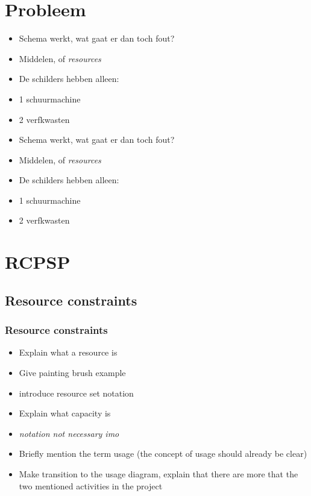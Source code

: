 \documentclass{beamer}
\theoremstyle{definition}
\newcommand{\mick}[1]{{\color{red}\emph{#1}}}
\begin{document}
\section{Probleem}
\begin{frame}
	\begin{itemize}
		\item Schema werkt, wat gaat er dan toch fout?
		\item Middelen, of \emph{resources}
		\item De schilders hebben alleen:
		\item 1 schuurmachine
		\item 2 verfkwasten
	\end{itemize}
\end{frame}

\begin{frame}
	\begin{itemize}
		\item Schema werkt, wat gaat er dan toch fout?
		\item Middelen, of \emph{resources}
		\item De schilders hebben alleen:
		\item 1 schuurmachine
		\item 2 verfkwasten
	\end{itemize}
\end{frame}

\section{RCPSP}

\subsection{Resource constraints}
\begin{frame}
	\frametitle{Resource constraints}
	\begin{itemize}
		\item Explain what a resource is
		\item Give painting brush example
		\item introduce resource set notation
		\item Explain what capacity is
		\item \mick{notation not necessary imo}
		\item Briefly mention the term usage (the concept of usage should already be clear)
		\item Make transition to the usage diagram, explain that there are more that the two mentioned activities in the project
	\end{itemize}
\end{frame}
	
\end{document}
